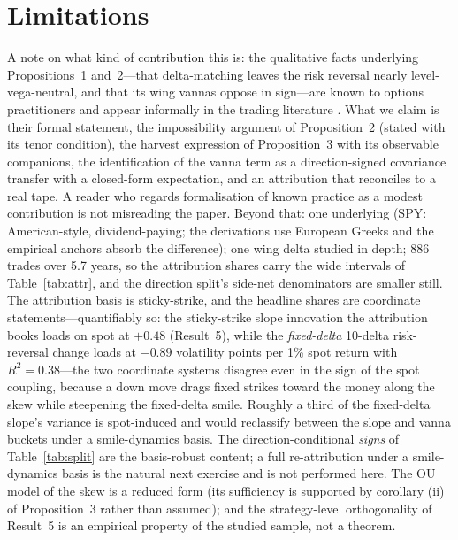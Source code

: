 \documentclass[11pt]{article}
\begin{document}
\section{Limitations}
A note on what kind of contribution this is: the qualitative facts underlying Propositions~1
and~2---that delta-matching leaves the risk reversal nearly level-vega-neutral, and that its
wing vannas oppose in sign---are known to options practitioners and appear informally in the
trading literature \citep{sinclair}. What we claim is their formal statement, the
impossibility argument of Proposition~2 (stated with its tenor condition), the harvest
expression of Proposition~3 with its
observable companions, the identification of the vanna term as a direction-signed covariance
transfer with a
closed-form expectation, and an attribution that reconciles to a real tape. A reader who
regards formalisation of known practice as a modest contribution is not misreading the paper.
Beyond that: one underlying (SPY: American-style, dividend-paying; the derivations use European Greeks and
the empirical anchors absorb the difference); one wing delta studied in depth; 886 trades over
5.7 years, so the attribution shares carry the wide intervals of Table~\ref{tab:attr}, and the
direction split's side-net denominators are smaller still. The attribution basis is
sticky-strike, and the headline shares are coordinate statements---quantifiably so: the
sticky-strike slope innovation the attribution books loads on spot at $+0.48$ (Result~5),
while the \emph{fixed-delta} 10-delta risk-reversal change loads at $-0.89$ volatility points
per 1\% spot return with $R^2 = 0.38$---the two coordinate systems disagree even in the sign
of the spot coupling, because a down move drags fixed strikes toward the money along the skew
while steepening the fixed-delta smile. Roughly a third of the fixed-delta slope's variance is
spot-induced and would reclassify between the slope and vanna buckets under a smile-dynamics
basis. The direction-conditional \emph{signs} of Table~\ref{tab:split} are the
basis-robust content; a full re-attribution under a smile-dynamics basis is the natural next
exercise and is not performed here. The OU
model of the skew is a reduced form (its sufficiency is supported by corollary (ii) of
Proposition~3 rather than assumed); and the strategy-level orthogonality of Result~5 is
an empirical property of the studied sample, not a theorem.

\appendix
\end{document}
